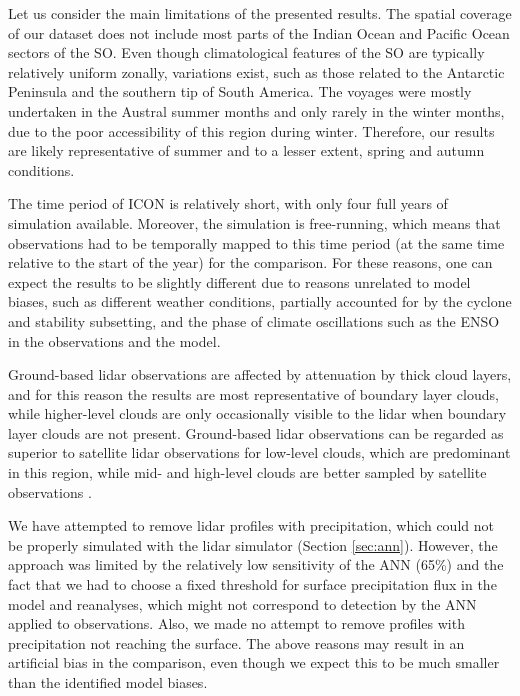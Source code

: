 \documentclass[12pt,a4paper]{article}
\begin{document}
Let us consider the main limitations of the presented results. The spatial
coverage of our dataset does not include most parts of the Indian Ocean and
Pacific Ocean sectors of the SO. Even though climatological features of the SO
are typically relatively uniform zonally, variations exist, such as those
related to the Antarctic Peninsula and the southern tip of South America. The
voyages were mostly undertaken in the Austral summer months and only rarely in
the winter months, due to the poor accessibility of this region during winter.
Therefore, our results are likely representative of summer and to a lesser
extent, spring and autumn conditions.

The time period of ICON is relatively short, with only four full years of
simulation available. Moreover, the simulation is free-running, which means
that observations had to be temporally mapped to this time period (at the same
time relative to the start of the year) for the comparison. For these reasons,
one can expect the results to be slightly different due to reasons unrelated to
model biases, such as different weather conditions, partially accounted for by the cyclone and stability subsetting, and the phase of climate
oscillations such as the ENSO in the observations and the model.

Ground-based lidar observations are affected by attenuation by thick cloud
layers, and for this reason the results are most representative of boundary
layer clouds, while higher-level clouds are only occasionally visible to the
lidar when boundary layer clouds are not present. Ground-based lidar
observations can be regarded as superior to satellite lidar observations for
low-level clouds, which are predominant in this region, while mid- and
high-level clouds are better sampled by satellite observations
\citep{mcerlich2021}.

We have attempted to remove lidar profiles with precipitation, which could not be
properly simulated with the lidar simulator (Section \ref{sec:ann}). However,
the approach was limited by the relatively low sensitivity of the ANN (65\%)
and the fact that we had to choose a fixed threshold for surface precipitation
flux in the model and reanalyses, which might not correspond to
detection by the ANN applied to observations. Also, we made no attempt
to remove profiles with precipitation not reaching the surface. The above
reasons may result in an artificial bias in the comparison, even though we
expect this to be much smaller than the identified model biases.
\end{document}
